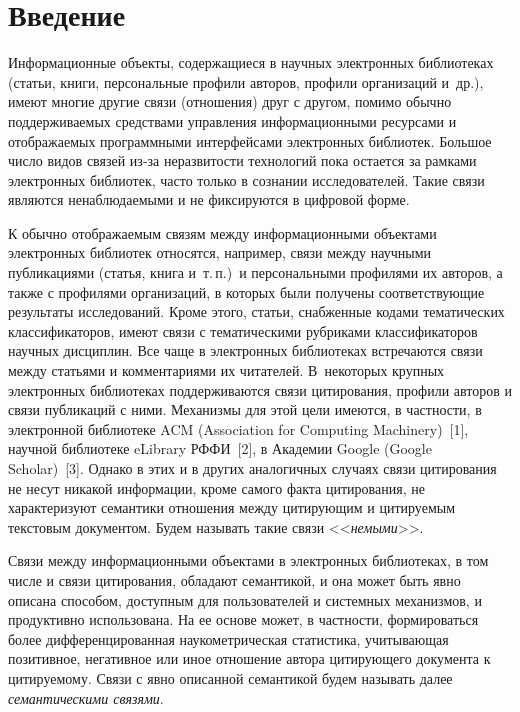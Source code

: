       \begin{multicols}{2}

            \label{st\stat}


\section{Введение}

  Информационные объекты, содержащиеся в научных электронных 
библиотеках (статьи, книги, персональные профили авторов, профили 
организаций и~др.), имеют многие другие связи (отношения) друг с другом, 
помимо обычно поддерживаемых средствами управления информационными 
ресурсами и отображаемых программными интерфейсами электронных 
библиотек. Большое число видов связей из-за неразвитости технологий пока 
остается за рамками электронных библиотек, час\-то только в сознании 
исследователей. Такие связи являются ненаблюдаемыми и не фиксируются в 
цифровой форме. 
  
  К обычно отображаемым связям между информационными объектами 
электронных библиотек относятся, например, связи между научными 
пуб\-ли\-ка\-ци\-ями (статья, книга и~т.\,п.)\ и персональными профилями их авторов, 
а также с профилями организаций, в которых были получены соответствующие 
результаты исследований. Кроме этого, \mbox{статьи}, снабженные кодами 
тематических классификаторов, имеют связи с тематическими рубриками 
классификаторов научных дисциплин. Все чаще в электронных библиотеках 
встречаются связи между статьями и комментариями их читателей. 
В~некоторых крупных электронных библиотеках поддерживаются связи 
цитирования, профили авторов и связи публикаций с ними. Механизмы для 
этой цели имеются, в частности, в электронной биб\-лио\-те\-ке {ACM} 
({Association for Computing Machinery})~[1], научной библиотеке 
{eLibrary} РФФИ~[2], в Академии {Google} ({Google 
Scholar})~[3]. Однако в этих и в других аналогичных случаях связи 
цитирования не несут никакой информации, кроме самого факта цитирования, 
не характеризуют семантики отношения между цитирующим и цитируемым 
текстовым документом. Будем называть такие связи <<\textit{немыми}>>.
  
  Связи между информационными объектами в электронных библиотеках, в 
том числе и связи цитирования, обладают семантикой, и она может быть явно 
описана способом, доступным для пользователей и системных механизмов, и 
продуктивно использована. На ее основе может, в частности, формироваться 
более дифференцированная нау\-ко\-мет\-ри\-че\-ская статистика, учитывающая 
позитивное, негативное или иное отношение автора цитирующего документа к 
цитируемому. Связи с явно описанной семантикой будем называть далее 
\textit{семантическими связями}. 
  

\end{multicols}
